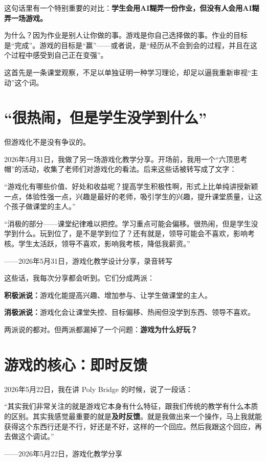 这句话里有一个特别重要的对比：\textbf{学生会用AI糊弄一份作业，但没有人会用AI糊弄一场游戏。}

为什么？因为作业是别人让你做的事。游戏是你自己选择做的事。作业的目标是``完成''。游戏的目标是``赢''——或者说，是``经历从不会到会的过程，并且在这个过程中感受到自己正在变强''。

这首先是一条课堂观察，不足以单独证明一种学习理论，却足以逼我重新审视``主动''这个词。

\section{``很热闹，但是学生没学到什么''}

但游戏化不是没有争议的。

2026年5月31日，我做了另一场游戏化教学分享。开场前，我用一个``六顶思考帽''的活动，收集了老师们对游戏化的看法。后来这些话被转写成了文字：

\begin{shiyu-inline}
``游戏化有哪些价值、好处和收益呢？提高学生积极性啊，形式上比单纯讲授新颖一点，体验性强一点，兴趣是最好的老师，吸引学生的兴趣，提升课堂质量，让这个孩子做课堂的主人。''

``消极的部分——课堂纪律难以把控。学习重点可能会偏移。很热闹，但是学生没学到什么。玩到位了，是不是学到位了？还有就是，领导可能会不喜欢，影响考核。学生太活跃，领导不喜欢，影响我考核，降低我薪资。''

\hfill ——2026年5月31日，游戏化教学设计分享，录音转写
\end{shiyu-inline}

这些话，我每次分享都会听到。它们分成两派：

\textbf{积极派说：}游戏化能提高兴趣、增加参与、让学生做课堂的主人。

\textbf{消极派说：}游戏化会让课堂失控、目标偏移、热闹但没学到东西、领导不喜欢。

两派说的都对。但两派都漏掉了一个问题：\textbf{游戏为什么好玩？}

\section{游戏的核心：即时反馈}

2026年5月22日，我在讲 Poly Bridge 的时候，说了一段话：

\begin{shiyu-inline}
``其实我们非常关注的就是游戏它本身有什么特征，跟我们传统的教学有什么本质的区别。其实我感觉最重要的就是\textbf{及时反馈}。就是我做出来一个操作，马上我就能获得这个东西行还是不行，好还是不好，这样的一个回应。然后我跟这个回应，再去做这个调试。''

\hfill ——2026年5月22日，游戏化教学分享
\end{shiyu-inline}


